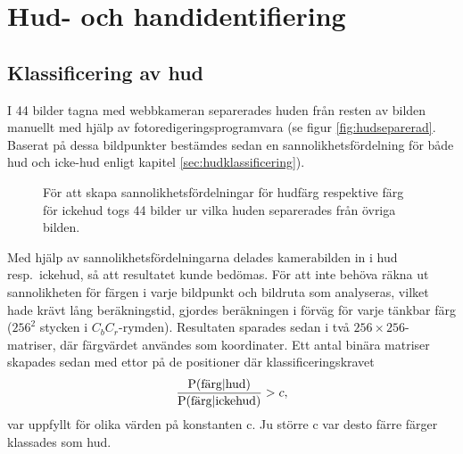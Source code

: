 \section{Hud- och handidentifiering}

\subsection{Klassificering av hud}
I 44 bilder tagna med webbkameran separerades huden från resten av
bilden manuellt med hjälp av fotoredigeringsprogramvara (se figur
\vref{fig:hudseparerad}. Baserat på
dessa bildpunkter bestämdes sedan en sannolikhetsfördelning för både hud
och icke-hud enligt kapitel \ref{sec:hudklassificering}). 

\begin{figure}[tb]
	\centering 
	\caption{För att skapa sannolikhetsfördelningar för hudfärg
          respektive färg för ickehud togs 44 bilder ur vilka huden
          separerades från övriga bilden.}
	\label{fig:hudseparerad}
\end{figure}


Med hjälp av
sannolikhetsfördelningarna delades kamerabilden in i hud
resp.~ickehud, så att resultatet kunde bedömas. För att inte behöva
räkna ut sannolikheten för färgen i varje bildpunkt och bildruta
som analyseras,
vilket hade krävt lång beräkningstid, gjordes beräkningen
i förväg för varje tänkbar färg ($256^2$ stycken i
$C_bC_r$-rymden). Resultaten sparades
sedan i två $256\times256$-matriser, där färgvärdet användes som
koordinater. Ett antal binära matriser skapades sedan med ettor på de
positioner där klassificeringskravet 
\begin{equation*}
	\frac{\mathrm{P}(\textrm{färg}|\textrm{hud})}{\mathrm{P}(\textrm{färg}|\textrm{ickehud})} > c,
\end{equation*}
var uppfyllt för olika värden på konstanten c. Ju större c var desto färre
färger klassades som hud. 

